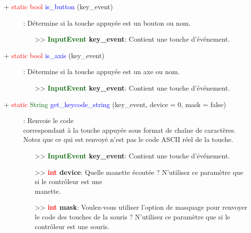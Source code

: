 \documentclass[a4paper, 11pt]{article}
\begin{document}
	\begin{description}
		\item [+ \textcolor{red}{static bool} \textcolor{blue}{is\_button} (key\_event)]: Détermine si la 
		touche appuyée est un bouton ou nom.
		\begin{itemize}
			\item[>> \textbf{\textcolor{darkgreen}{InputEvent} key\_event}:] Contient une touche 
			d'événement.\\
		\end{itemize}
	\end{description}
	\begin{description}
		\item [+ \textcolor{red}{static bool} \textcolor{blue}{is\_axis} (key\_event)]: Détermine si la 
		touche appuyée est un axe ou nom.
		\begin{itemize}
			\item[>> \textbf{\textcolor{darkgreen}{InputEvent} key\_event}:] Contient une touche 
			d'événement.\\
		\end{itemize}
	\end{description}
	\begin{description}
		\item [+ \textcolor{red}{static} \textcolor{darkgreen}{String} \textcolor{blue}
		{get\_keycode\_string} (key\_event, device = 0, mask = false)]: Renvoie le code \\correspondant à la 
		touche appuyée sous format de chaîne de caractères. Notez que ce qui est renvoyé n'est pas le code 
		ASCII réel de la touche.
		\begin{itemize}
			\item[>> \textbf{\textcolor{darkgreen}{InputEvent} key\_event}:] Contient une touche 
			d'événement.
			\item[>> \textbf{\textcolor{red}{int} device}:] Quelle manette écoutée ? N'utilisez ce paramètre 
			que si le contrôleur est une \\manette.
			\item[>> \textbf{\textcolor{red}{int} mask}:] Voulez-vous utiliser l'option de masquage pour 
			renvoyer le code des touches de la souris ? N'utilisez ce paramètre que si le contrôleur est une 
			souris.\\
		\end{itemize}
	\end{description}
\end{document}
